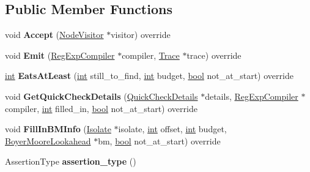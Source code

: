 \subsection*{Public Member Functions}
\begin{DoxyCompactItemize}
\item 
\mbox{\label{classv8_1_1internal_1_1AssertionNode_aa0c9a8889fabcb37885a3f8961149a78}} 
void {\bfseries Accept} (\mbox{\hyperlink{classv8_1_1internal_1_1NodeVisitor}{Node\+Visitor}} $\ast$visitor) override
\item 
\mbox{\label{classv8_1_1internal_1_1AssertionNode_ad0efebb4d755192c507e3d06b3ebe17c}} 
void {\bfseries Emit} (\mbox{\hyperlink{classv8_1_1internal_1_1RegExpCompiler}{Reg\+Exp\+Compiler}} $\ast$compiler, \mbox{\hyperlink{classv8_1_1internal_1_1Trace}{Trace}} $\ast$trace) override
\item 
\mbox{\label{classv8_1_1internal_1_1AssertionNode_a9a46699943b5a94dd267aa999868050a}} 
\mbox{\hyperlink{classint}{int}} {\bfseries Eats\+At\+Least} (\mbox{\hyperlink{classint}{int}} still\+\_\+to\+\_\+find, \mbox{\hyperlink{classint}{int}} budget, \mbox{\hyperlink{classbool}{bool}} not\+\_\+at\+\_\+start) override
\item 
\mbox{\label{classv8_1_1internal_1_1AssertionNode_ade004f77f287eee56fbc6ad5661871ed}} 
void {\bfseries Get\+Quick\+Check\+Details} (\mbox{\hyperlink{classv8_1_1internal_1_1QuickCheckDetails}{Quick\+Check\+Details}} $\ast$details, \mbox{\hyperlink{classv8_1_1internal_1_1RegExpCompiler}{Reg\+Exp\+Compiler}} $\ast$compiler, \mbox{\hyperlink{classint}{int}} filled\+\_\+in, \mbox{\hyperlink{classbool}{bool}} not\+\_\+at\+\_\+start) override
\item 
\mbox{\label{classv8_1_1internal_1_1AssertionNode_ac2c45a469759cd6ee4beabafc195aad5}} 
void {\bfseries Fill\+In\+B\+M\+Info} (\mbox{\hyperlink{classv8_1_1internal_1_1Isolate}{Isolate}} $\ast$isolate, \mbox{\hyperlink{classint}{int}} offset, \mbox{\hyperlink{classint}{int}} budget, \mbox{\hyperlink{classv8_1_1internal_1_1BoyerMooreLookahead}{Boyer\+Moore\+Lookahead}} $\ast$bm, \mbox{\hyperlink{classbool}{bool}} not\+\_\+at\+\_\+start) override
\item 
\mbox{\label{classv8_1_1internal_1_1AssertionNode_a1c1279600bc32129daf91cb75c982e09}} 
Assertion\+Type {\bfseries assertion\+\_\+type} ()
\end{DoxyCompactItemize}
